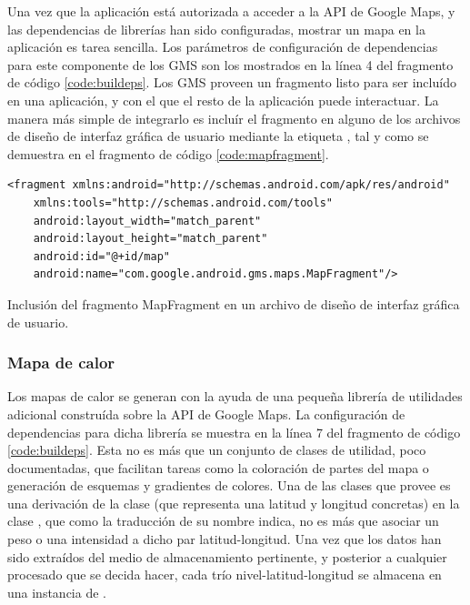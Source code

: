     Una vez que la aplicación está autorizada a acceder a la API de Google Maps, y las dependencias de librerías han sido configuradas, mostrar un mapa en la aplicación es tarea sencilla. Los parámetros de configuración de dependencias para este componente de los \ac{GMS} son los mostrados en la línea 4 del fragmento de código \ref{code:buildeps}. Los \ac{GMS} proveen un fragmento  listo para ser incluído en una aplicación, y con el que el resto de la aplicación puede interactuar. La manera más simple de integrarlo es incluír el fragmento en alguno de los archivos de diseño de interfaz gráfica de usuario mediante la etiqueta , tal y como se demuestra en el fragmento de código \ref{code:mapfragment}.
           
\begin{listing}[h] 
\begin{verbatim}
<fragment xmlns:android="http://schemas.android.com/apk/res/android"
    xmlns:tools="http://schemas.android.com/tools"
    android:layout_width="match_parent"
    android:layout_height="match_parent"
    android:id="@+id/map"
    android:name="com.google.android.gms.maps.MapFragment"/>
\end{verbatim}
\caption{Inclusión del fragmento MapFragment en un archivo de diseño de interfaz gráfica de usuario.}
\label{code:mapfragment}
\end{listing}

\subsubsection{Mapa de calor}
    Los mapas de calor se generan con la ayuda de una pequeña librería de utilidades adicional construída sobre la API de Google Maps. La configuración de dependencias para dicha librería se muestra en la línea 7 del fragmento de código \ref{code:buildeps}. Esta no es más que un conjunto de clases de utilidad, poco documentadas, que facilitan tareas como la coloración de partes del mapa o generación de esquemas y gradientes de colores.
    Una de las clases que provee es una derivación de la clase  (que representa una latitud y longitud concretas) en la clase , que como la traducción de su nombre indica, no es más que asociar un peso o una intensidad a dicho par latitud-longitud.
    Una vez que los datos han sido extraídos del medio de almacenamiento pertinente, y posterior a cualquier procesado que se decida hacer, cada trío nivel-latitud-longitud se almacena en una instancia de . 
        
